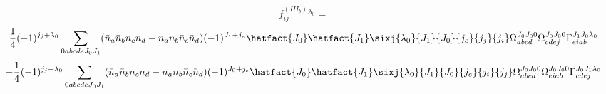 
\begin{dmath*}
f^{(III_b)}_{i j}^{{{\lambda}}_{0}} = 
\end{dmath*}
\begin{dmath*}
\frac{1}{4} \* (-1)^{{j}_{j}+{{\lambda}}_{0}} \* \sum_{0 a b c d e {J}_{0} {J}_{1}} \* (\bar{n}_{a} \* \bar{n}_{b} \* n_{c} \* n_{d} -n_{a} \* n_{b} \* \bar{n}_{c} \* \bar{n}_{d}) \* (-1)^{{J}_{1}+{j}_{e}} \* \hatfact{{J}_{0}} \* \hatfact{{J}_{1}} \* \sixj{{{\lambda}}_{0}}{{J}_{1}}{{J}_{0}}{{j}_{e}}{{j}_{j}}{{j}_{i}} \* \Omega_{a b c d}^{{J}_{0} {J}_{0} 0} \* \Omega_{c d e j}^{{J}_{0} {J}_{0} 0} \* \Gamma_{e i a b}^{{J}_{1} {J}_{0} {{\lambda}}_{0}}
\end{dmath*}
\begin{dmath*}
-\frac{1}{4} \* (-1)^{{j}_{j}+{{\lambda}}_{0}} \* \sum_{0 a b c d e {J}_{0} {J}_{1}} \* (\bar{n}_{a} \* \bar{n}_{b} \* n_{c} \* n_{d} -n_{a} \* n_{b} \* \bar{n}_{c} \* \bar{n}_{d}) \* (-1)^{{J}_{0}+{j}_{e}} \* \hatfact{{J}_{0}} \* \hatfact{{J}_{1}} \* \sixj{{{\lambda}}_{0}}{{J}_{1}}{{J}_{0}}{{j}_{e}}{{j}_{i}}{{j}_{j}} \* \Omega_{a b c d}^{{J}_{0} {J}_{0} 0} \* \Omega_{e i a b}^{{J}_{0} {J}_{0} 0} \* \Gamma_{c d e j}^{{J}_{0} {J}_{1} {{\lambda}}_{0}}
\end{dmath*}

